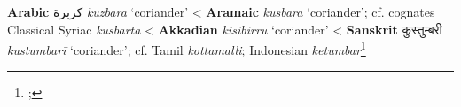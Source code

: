 \begin{etymology}\label{ety:kuzbura}
\textbf{Arabic} {كزبرة} \textit{kuzbara} `coriander'
< \textbf{Aramaic} {} \textit{kusbara} `coriander'; cf. cognates Classical Syriac  \textit{kūsbartā}
< \textbf{Akkadian} {} \textit{kisibirru} `coriander'
< \textbf{Sanskrit} {कुस्तुम्बरी} \textit{kustumbarī} `coriander'; cf. Tamil  \textit{kottamalli}; Indonesian \textit{ketumbar}\footnote{; }
\end{etymology}